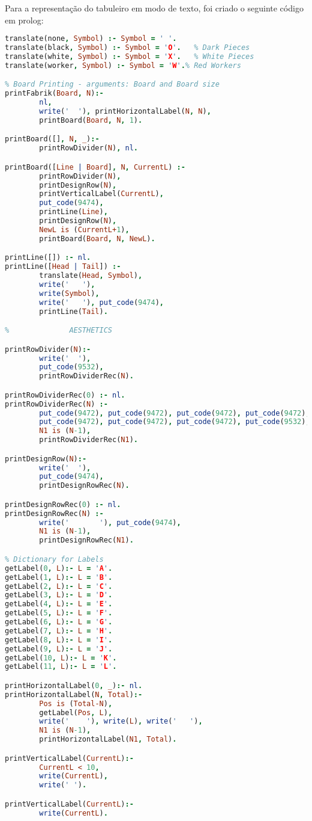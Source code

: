 \documentclass[a4paper]{article}
\begin{document}
Para a representação do tabuleiro em modo de texto, foi criado o seguinte código em prolog:
\begin{lstlisting}[language=prolog]
% Board Printing - Character Translation
translate(none, Symbol) :- Symbol = ' '.
translate(black, Symbol) :- Symbol = 'O'.	% Dark Pieces
translate(white, Symbol) :- Symbol = 'X'.	% White Pieces
translate(worker, Symbol) :- Symbol = 'W'.% Red Workers

% Board Printing - arguments: Board and Board size
printFabrik(Board, N):-
        nl, 
        write('  '), printHorizontalLabel(N, N),
        printBoard(Board, N, 1).

printBoard([], N, _):-
        printRowDivider(N), nl.

printBoard([Line | Board], N, CurrentL) :-
        printRowDivider(N),
        printDesignRow(N),
        printVerticalLabel(CurrentL),
        put_code(9474),
        printLine(Line),
        printDesignRow(N),
        NewL is (CurrentL+1),
        printBoard(Board, N, NewL).

printLine([]) :- nl.
printLine([Head | Tail]) :-
        translate(Head, Symbol),
        write('   '),
        write(Symbol),
        write('   '), put_code(9474),
        printLine(Tail).

%              AESTHETICS

printRowDivider(N):-
        write('  '),
        put_code(9532),
        printRowDividerRec(N).

printRowDividerRec(0) :- nl.
printRowDividerRec(N) :-
        put_code(9472), put_code(9472), put_code(9472), put_code(9472),
        put_code(9472), put_code(9472), put_code(9472), put_code(9532),
        N1 is (N-1),
        printRowDividerRec(N1).

printDesignRow(N):-
        write('  '),
        put_code(9474),
        printDesignRowRec(N).

printDesignRowRec(0) :- nl.
printDesignRowRec(N) :-
        write('       '), put_code(9474),
        N1 is (N-1),
        printDesignRowRec(N1).

% Dictionary for Labels
getLabel(0, L):- L = 'A'.
getLabel(1, L):- L = 'B'.
getLabel(2, L):- L = 'C'.
getLabel(3, L):- L = 'D'.
getLabel(4, L):- L = 'E'.
getLabel(5, L):- L = 'F'.
getLabel(6, L):- L = 'G'.
getLabel(7, L):- L = 'H'.
getLabel(8, L):- L = 'I'.
getLabel(9, L):- L = 'J'.
getLabel(10, L):- L = 'K'.
getLabel(11, L):- L = 'L'.

printHorizontalLabel(0, _):- nl.
printHorizontalLabel(N, Total):-
        Pos is (Total-N),
        getLabel(Pos, L),
        write('    '), write(L), write('   '),
        N1 is (N-1),
        printHorizontalLabel(N1, Total).        

printVerticalLabel(CurrentL):-
        CurrentL < 10,
        write(CurrentL),
        write(' ').

printVerticalLabel(CurrentL):-
        write(CurrentL).
\end{lstlisting}
\end{document}
